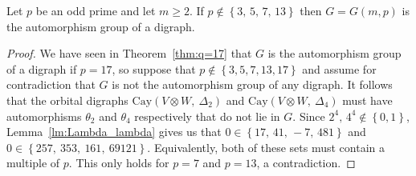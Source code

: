 \documentclass[ALCO, Unicode]{cedram}
\newcommand{\Cay}{\mathrm{Cay}}
\begin{document}
\begin{theorem} \label{thm:q-large-prime}
Let $p$ be an odd prime and let $m \geqslant 2$. If $p \notin \left\{3,\, 5,\, 7,\, 13 \right\}$ then $G = G{\left(m, p \right)}$ is the automorphism group of a digraph.
\end{theorem}
\begin{proof}
We have seen in Theorem~\ref{thm:q=17} that $G$ is the automorphism group of a digraph if $p = 17$, so suppose that $p \notin \left\{3, 5, 7, 13, 17 \right\}$ and assume for contradiction that $G$ is not the automorphism group of any digraph. It follows that the orbital digraphs $\Cay{\left(V \otimes W,\ \Delta_2 \right)}$ and $\Cay{\left(V \otimes W,\ \Delta_4 \right)}$ must have automorphisms $\theta_2$ and $\theta_4$ respectively that do not lie in $G$. Since $2^4,\, 4^4 \notin \left\{0, 1 \right\}$, Lemma~\ref{lm:Lambda_lambda} gives us that $0 \in \left\{17,\, 41,\, -7,\, 481 \right\}$ and $0 \in \left\{257,\ 353,\ 161,\ 69121 \right\}$. Equivalently, both of these sets must contain a multiple of $p$. This only holds for $p=7$ and $p=13$, a contradiction.
\end{proof}



\end{document}

